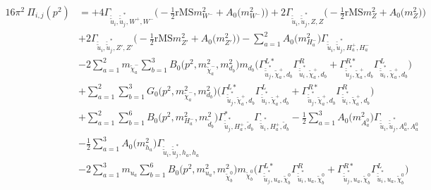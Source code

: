 \begin{itemize}
\begin{align} 
16\pi^2 \ \Pi_{i,j}(p^2) &= +4 {\Gamma_{\check{\tilde{u}}_{{i}},\check{\tilde{u}}^*_{{j}},W^+,W^-}} \Big(-\frac{1}{2} \text{rMS} m^2_{W^-}  + {A_0\Big(m^2_{W^-}\Big)}\Big)+2 {\Gamma_{\check{\tilde{u}}_{{i}},\check{\tilde{u}}^*_{{j}},Z,Z}} \Big(-\frac{1}{2} \text{rMS} m^2_{Z}  + {A_0\Big(m^2_{Z}\Big)}\Big)\nonumber \\ 
 &+2 {\Gamma_{\check{\tilde{u}}_{{i}},\check{\tilde{u}}^*_{{j}},{Z'},{Z'}}} \Big(-\frac{1}{2} \text{rMS} m^2_{{Z'}}  + {A_0\Big(m^2_{{Z'}}\Big)}\Big)- \sum_{a=1}^{2}{A_0\Big(m^2_{H^-_{{a}}}\Big)} {\Gamma_{\check{\tilde{u}}_{{i}},\check{\tilde{u}}^*_{{j}},H^+_{{a}},H^-_{{a}}}}  \nonumber \\ 
 &-2 \sum_{a=1}^{2}m_{\tilde{\chi}^-_{{a}}} \sum_{b=1}^{3}{B_0\Big(p^{2},m^2_{\tilde{\chi}^-_{{a}}},m^2_{d_{{b}}}\Big)} m_{d_{{b}}} \Big({\Gamma^{L*}_{\check{\tilde{u}}^*_{{j}},\tilde{\chi}^+_{{a}},d_{{b}}}} {\Gamma^R_{\check{\tilde{u}}^*_{{i}},\tilde{\chi}^+_{{a}},d_{{b}}}}  + {\Gamma^{R*}_{\check{\tilde{u}}^*_{{j}},\tilde{\chi}^+_{{a}},d_{{b}}}} {\Gamma^L_{\check{\tilde{u}}^*_{{i}},\tilde{\chi}^+_{{a}},d_{{b}}}} \Big)  \nonumber \\ 
 &+\sum_{a=1}^{2}\sum_{b=1}^{3}{G_0\Big(p^{2},m^2_{\tilde{\chi}^-_{{a}}},m^2_{d_{{b}}}\Big)} \Big({\Gamma^{L*}_{\check{\tilde{u}}^*_{{j}},\tilde{\chi}^+_{{a}},d_{{b}}}} {\Gamma^L_{\check{\tilde{u}}^*_{{i}},\tilde{\chi}^+_{{a}},d_{{b}}}}  + {\Gamma^{R*}_{\check{\tilde{u}}^*_{{j}},\tilde{\chi}^+_{{a}},d_{{b}}}} {\Gamma^R_{\check{\tilde{u}}^*_{{i}},\tilde{\chi}^+_{{a}},d_{{b}}}} \Big)\nonumber \\ 
 &+\sum_{a=1}^{2}\sum_{b=1}^{6}{B_0\Big(p^{2},m^2_{H^-_{{a}}},m^2_{\tilde{d}_{{b}}}\Big)} {\Gamma^*_{\check{\tilde{u}}^*_{{j}},H^+_{{a}},\tilde{d}_{{b}}}} {\Gamma_{\check{\tilde{u}}^*_{{i}},H^+_{{a}},\tilde{d}_{{b}}}} -\frac{1}{2} \sum_{a=1}^{3}{A_0\Big(m^2_{A^0_{{a}}}\Big)} {\Gamma_{\check{\tilde{u}}_{{i}},\check{\tilde{u}}^*_{{j}},A^0_{{a}},A^0_{{a}}}}  \nonumber \\ 
 &-\frac{1}{2} \sum_{a=1}^{3}{A_0\Big(m^2_{h_{{a}}}\Big)} {\Gamma_{\check{\tilde{u}}_{{i}},\check{\tilde{u}}^*_{{j}},h_{{a}},h_{{a}}}}  \nonumber \\ 
 &-2 \sum_{a=1}^{3}m_{u_{{a}}} \sum_{b=1}^{6}{B_0\Big(p^{2},m^2_{u_{{a}}},m^2_{\tilde{\chi}^0_{{b}}}\Big)} m_{\tilde{\chi}^0_{{b}}} \Big({\Gamma^{L*}_{\check{\tilde{u}}^*_{{j}},u_{{a}},\tilde{\chi}^0_{{b}}}} {\Gamma^R_{\check{\tilde{u}}^*_{{i}},u_{{a}},\tilde{\chi}^0_{{b}}}}  + {\Gamma^{R*}_{\check{\tilde{u}}^*_{{j}},u_{{a}},\tilde{\chi}^0_{{b}}}} {\Gamma^L_{\check{\tilde{u}}^*_{{i}},u_{{a}},\tilde{\chi}^0_{{b}}}} \Big)  \nonumber \\ 

\end{align}
\end{itemize}
